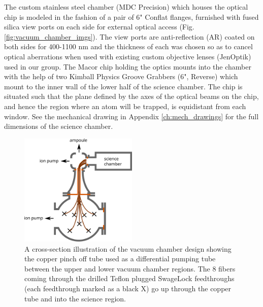 The custom stainless steel chamber (MDC Precision) which houses the optical chip is modeled in the fashion of a pair of 6" Conflat flanges, furnished with fused silica view ports on each side for external optical access (Fig. \ref{fig:vacuum_chamber_imgs}). The view ports are anti-reflection (AR) coated on both sides for 400-1100 nm and the thickness of each was chosen so as to cancel optical aberrations when used with existing custom objective lenses (JenOptik) used in our group. The Macor chip holding the optics mounts into the chamber with the help of two Kimball Physics Groove Grabbers (6", Reverse) which mount to the inner wall of the lower half of the science chamber. The chip is situated such that the plane defined by the axes of the optical beams on the chip, and hence the region where an atom will be trapped, is equidistant from each window. See the mechanical drawing in Appendix \ref{ch:mech_drawings} for the full dimensions of the science chamber.

\begin{figure}[!h]
    \centering
    \includegraphics[width=0.5\textwidth]{Images/differential_pumping.pdf}
    \caption{A cross-section illustration of the vacuum chamber design\protect\footnotemark{} showing the copper pinch off tube used as a differential pumping tube between the upper and lower vacuum chamber regions. The 8 fibers coming through the drilled Teflon plugged SwageLock feedthroughs (each feedthrough marked as a black X) go up through the copper tube and into the science region.}
    \label{fig:differential_pumping}
\end{figure}

